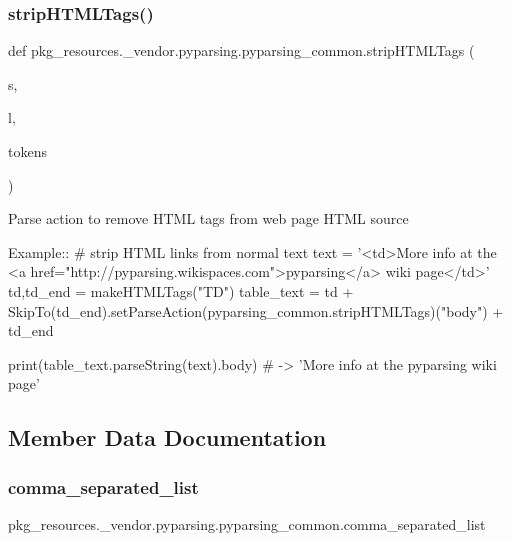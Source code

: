 \subsubsection{\texorpdfstring{strip\+H\+T\+M\+L\+Tags()}{stripHTMLTags()}}
{\footnotesize\ttfamily def pkg\+\_\+resources.\+\_\+vendor.\+pyparsing.\+pyparsing\+\_\+common.\+strip\+H\+T\+M\+L\+Tags (\begin{DoxyParamCaption}\item[{}]{s,  }\item[{}]{l,  }\item[{}]{tokens }\end{DoxyParamCaption})\hspace{0.3cm}{\ttfamily [static]}}

\begin{DoxyVerb}Parse action to remove HTML tags from web page HTML source

Example::
    # strip HTML links from normal text 
    text = '<td>More info at the <a href="http://pyparsing.wikispaces.com">pyparsing</a> wiki page</td>'
    td,td_end = makeHTMLTags("TD")
    table_text = td + SkipTo(td_end).setParseAction(pyparsing_common.stripHTMLTags)("body") + td_end
    
    print(table_text.parseString(text).body) # -> 'More info at the pyparsing wiki page'
\end{DoxyVerb}
 

\subsection{Member Data Documentation}
\mbox{\label{classpkg__resources_1_1__vendor_1_1pyparsing_1_1pyparsing__common_a66395be311bf0493a0fbbb0e70a313c4}} 
\subsubsection{\texorpdfstring{comma\+\_\+separated\+\_\+list}{comma\_separated\_list}}
{\footnotesize\ttfamily pkg\+\_\+resources.\+\_\+vendor.\+pyparsing.\+pyparsing\+\_\+common.\+comma\+\_\+separated\+\_\+list\hspace{0.3cm}{\ttfamily [static]}}

